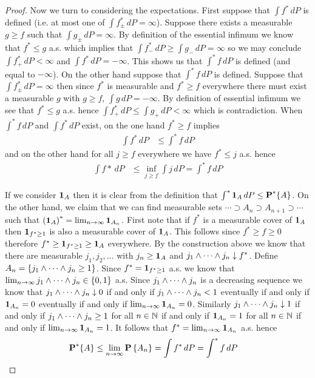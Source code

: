 \begin{proof}
Now we turn to considering the expectations.  First suppose that $\int f^* \, dP$ is defined (i.e. at most one of $\int f^*_\pm \, dP = \infty$).  Suppose there exists a measurable $g \geq f$ such
that $\int g_\pm \, dP = \infty$.  By definition of the essential infimum we know that $f^* \leq g$ a.s. which implies that $\int f^*_- \, dP \geq \int g_- \, dP = \infty$ so we may conclude $\int f^*_+ \, dP < \infty$ and $\int f^* \, dP = -\infty$.  This shows us that $\int^* f \, dP$ is defined (and equal to $-\infty$).    On the other hand suppose that $\int^* f \, dP$ is defined. Suppose that $\int f_\pm^* \, dP = \infty$ then since $f^*$ is measurable and $f^* \geq f$  everywhere there must exist a measurable $g$ with $g \geq f$, $\int g \, dP = -\infty$.  By definition of essential infimum we see that $f^* \leq g$ a.s. hence $\int f^*_+ \, dP \leq \int g_+ \, dP < \infty$ which is contradiction.  When $\int^* f \, dP$ and $\int f^* \, dP$ exist, on the one hand $f^* \geq f$ implies
\begin{align*}
\int f^* \, dP &\leq \int^* f \, dP
\end{align*}
and on the other hand for all $j \geq f$ everywhere we have $f^* \leq j$ a.s. hence
\begin{align*}
\int f* \, dP &\leq \inf_{j \geq f} \int j \, dP = \int^* f \, dP
\end{align*}

If we consider $\textbf{1}_{A}$ then it is clear from the definition that $\int^* \textbf{1}_{A} \, dP \leq \textbf{P}^*\{A\}$.  On the other hand, we claim that we can find measurable sets $\dotsb \supset A_n \supset A_{n+1} \supset \dotsb$ such that $\left( \textbf{1}_{A} \right)^* = \lim_{n \to \infty} \textbf{1}_{A_n}$.  First note that if $f^*$ is a measurable cover of $\textbf{1}_{A}$ then $\textbf{1}_{f^* \geq 1}$ is also a measurable cover of $\textbf{1}_{A}$.  This follows since $f^* \geq f \geq 0$ therefore $f^* \geq \textbf{1}_{f^* \geq 1} \geq \textbf{1}_{A}$ everywhere.  By the construction above we know that there are measurable $j_1, j_2, \dotsc$ with $j_n \geq \textbf{1}_{A}$ and $j_1 \wedge \dotsb \wedge j_n  \downarrow f^*$.  Define $A_n = \lbrace j_1 \wedge \dotsb \wedge j_n \geq 1 \rbrace$.  Since $f^* =  \textbf{1}_{f^* \geq 1}$ a.s. we know that $\lim_{n\to \infty} j_1 \wedge \dotsb \wedge j_n \in \lbrace 0, 1 \rbrace$ a.s.  Since
$j_1 \wedge \dotsb \wedge j_n$ is a decreasing sequence we know that $ j_1 \wedge \dotsb \wedge j_n \downarrow 0$ if and only if $j_1 \wedge \dotsb \wedge j_n < 1$ eventually if and only if $\textbf{1}_{A_n} = 0$ eventually if and only if $\lim_{n \to \infty} \textbf{1}_{A_n} = 0$.  Similarly $ j_1 \wedge \dotsb \wedge j_n \downarrow 1$ if and only if $j_1 \wedge \dotsb \wedge j_n \geq 1$ for all $n \in \mathbb{N}$ if and only if $\textbf{1}_{A_n} = 1$ for all $n \in \mathbb{N}$ if and only if $\lim_{n \to \infty} \textbf{1}_{A_n} = 1$.  It follows that $f^* = \lim_{n \to \infty} \textbf{1}_{A_n}$ a.s. hence
\begin{align*}
\textbf{P}^*\{A\} &\leq \lim_{n \to \infty} \textbf{P}\left \{A_n \right \} = \int f^* \, dP = \int^* f \, dP
\end{align*}
\end{proof}

